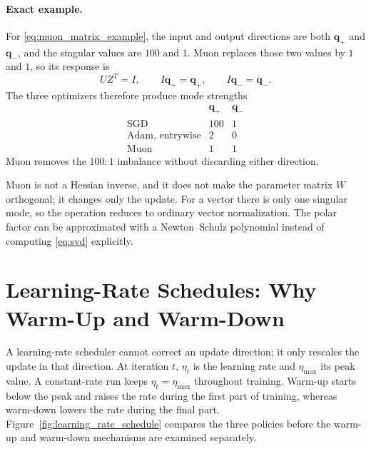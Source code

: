 \documentclass[11pt,letterpaper]{article}
\begin{document}
\paragraph{Exact example.}
For \eqref{eq:muon_matrix_example}, the input and output directions are both
\(\bm q_+\) and \(\bm q_-\), and the singular values are \(100\) and \(1\).
Muon replaces those two values by \(1\) and \(1\), so its response is
\begin{equation}
  UZ^T=I,
  \qquad
  I\bm q_+=\bm q_+,
  \qquad
  I\bm q_-=\bm q_-.
\end{equation}
The three optimizers therefore produce mode strengths
\begin{equation}
  \begin{array}{c|cc}
    &\bm q_+&\bm q_-\\ \hline
    \text{SGD}&100&1\\
    \text{Adam, entrywise}&2&0\\
    \text{Muon}&1&1
  \end{array}
\end{equation}
Muon removes the \(100{:}1\) imbalance without discarding either direction.

Muon is not a Hessian inverse, and it does not make the parameter matrix
\(W\) orthogonal; it changes only the update. For a vector there is only one
singular mode, so the operation reduces to ordinary vector normalization. The
polar factor can be approximated with a Newton--Schulz polynomial instead of
computing \eqref{eq:svd} explicitly.

\newpage
\section{Learning-Rate Schedules: Why Warm-Up and Warm-Down}

A learning-rate scheduler cannot correct an update direction; it only rescales
the update in that direction. At iteration \(t\), \(\eta_t\) is
the learning rate and \(\eta_{\max}\) its peak value. A
constant-rate run keeps \(\eta_t=\eta_{\max}\) throughout training. Warm-up
starts below the peak and raises the rate during the first part of training,
whereas warm-down lowers the rate during the final part.
Figure~\ref{fig:learning_rate_schedule} compares the three policies before
the warm-up and warm-down mechanisms are examined separately.
\end{document}
